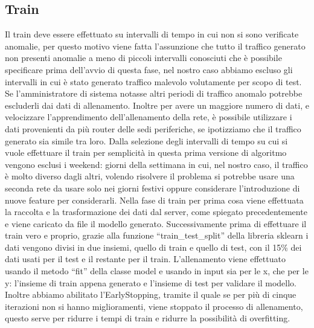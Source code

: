 \subsection{Train}
Il train deve essere effettuato su intervalli di tempo in cui non si sono verificate anomalie, per questo motivo viene fatta l'assunzione che tutto il traffico generato non presenti anomalie a meno di piccoli intervalli conosciuti che è possibile specificare prima dell'avvio di questa fase, nel nostro caso abbiamo escluso gli intervalli in cui è stato generato traffico malevolo volutamente per scopo di test. Se l'amministratore di sistema notasse altri periodi di traffico anomalo potrebbe escluderli dai dati di allenamento.
Inoltre per avere un maggiore numero di dati, e velocizzare l'apprendimento dell'allenamento della rete, è possibile utilizzare i dati provenienti da più router delle sedi periferiche, se ipotizziamo che il traffico generato sia simile tra loro.
Dalla selezione degli intervalli di tempo su cui si vuole effettuare il train per semplicità in questa prima versione di algoritmo vengono esclusi i weekend: giorni della settimana in cui, nel nostro caso, il traffico è molto diverso dagli altri, volendo risolvere il problema si potrebbe usare una seconda rete da usare solo nei giorni festivi oppure considerare l'introduzione di nuove feature per considerarli. %
Nella fase di train per prima cosa viene effettuata la raccolta e la trasformazione dei dati dal server, come spiegato precedentemente e viene caricato da file il modello generato.
Successivamente prima di effettuare il train vero e proprio, grazie alla funzione ``train\_test\_split'' della libreria sklearn i dati vengono divisi in due insiemi, quello di train e quello di test, con il 15\% dei dati usati per il test e il restante per il train.
L'allenamento viene effettuato usando il metodo ``fit'' della classe model e usando in input sia per le x, che per le y: l'insieme di train appena generato e l'insieme di test per validare il modello. Inoltre abbiamo abilitato l'EarlyStopping, tramite il quale se per più di cinque iterazioni non si hanno miglioramenti, viene stoppato il processo di allenamento, questo serve per ridurre i tempi di train e ridurre la possibilità di overfitting.

